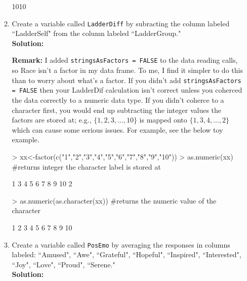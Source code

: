 \documentclass{article}
\begin{document}
\begin{enumerate}
\begin{enumerate}
\begin{Schunk}
\begin{Soutput}
[1] 1010
\end{Soutput}
\end{Schunk}
\item Create a variable called \texttt{LadderDiff} by subracting the column labeled
``LadderSelf" from the column labeled ``LadderGroup."\\
\textbf{Solution:}
\begin{Schunk}
\end{Schunk}
\textbf{Remark:} I added \texttt{stringsAsFactors = FALSE} to the data
reading calls, so Race isn't a factor in my data frame. To me,
I find it simpler to do this than to worry about what's a factor.
If you didn't add \texttt{stringsAsFactors = FALSE} then your
LadderDif calculation isn't correct unless you coherced the data 
correctly to a numeric data type. If you didn't coherce to a
character first, you would end up subtracting the integer values
the factors are stored at; e.g., $\{1,2,3,...,10\}$ is mapped
onto $\{1,3,4,...,2\}$ which can cause some serious issues.
For example, see the below toy example.
\begin{Schunk}
\begin{Sinput}
> xx<-factor(c("1","2","3","4","5","6","7","8","9","10"))
> as.numeric(xx) #returns integer the character label is stored at
\end{Sinput}
\begin{Soutput}
 [1]  1  3  4  5  6  7  8  9 10  2
\end{Soutput}
\begin{Sinput}
> as.numeric(as.character(xx)) #returns the numeric value of the character
\end{Sinput}
\begin{Soutput}
 [1]  1  2  3  4  5  6  7  8  9 10
\end{Soutput}
\end{Schunk}
\item Create a variable called \texttt{PosEmo} by averaging the responses in columns
labeled: ``Amused", ``Awe", ``Grateful", ``Hopeful", ``Inspired", ``Interested",
``Joy", ``Love", ``Proud", ``Serene."\\
\textbf{Solution:}
\begin{Schunk}

\end{Schunk}
\end{enumerate}
\end{enumerate}
\end{document}
